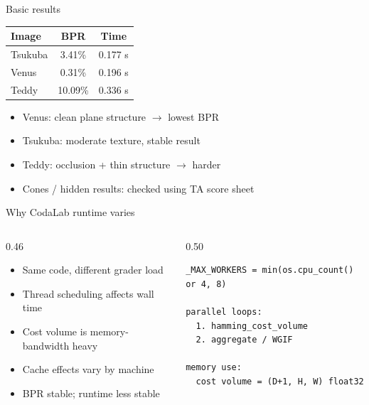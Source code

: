 \documentclass[aspectratio=169,11pt]{beamer}
\begin{document}
\begin{frame}{Basic results}
\begin{table}
\centering
\large
\begin{tabular}{lcc}
\toprule
Image & BPR & Time \\
\midrule
Tsukuba & 3.41\% & 0.177 s \\
Venus & 0.31\% & 0.196 s \\
Teddy & 10.09\% & 0.336 s \\
\bottomrule
\end{tabular}
\end{table}

\begin{itemize}
    \item Venus: clean plane structure $\rightarrow$ lowest BPR
    \item Tsukuba: moderate texture, stable result
    \item Teddy: occlusion + thin structure $\rightarrow$ harder
    \item Cones / hidden results: checked using TA score sheet
\end{itemize}
\end{frame}

\begin{frame}[fragile]{Why CodaLab runtime varies}
\begin{columns}[T,totalwidth=\textwidth]
\begin{column}{0.46\textwidth}
\begin{itemize}
    \item Same code, different grader load
    \item Thread scheduling affects wall time
    \item Cost volume is memory-bandwidth heavy
    \item Cache effects vary by machine
    \item BPR stable; runtime less stable
\end{itemize}
\end{column}
\begin{column}{0.50\textwidth}
\scriptsize
\begin{verbatim}
_MAX_WORKERS = min(os.cpu_count() or 4, 8)

parallel loops:
  1. hamming_cost_volume
  2. aggregate / WGIF

memory use:
  cost volume = (D+1, H, W) float32
\end{verbatim}
\end{column}
\end{columns}
\end{frame}
\end{document}
